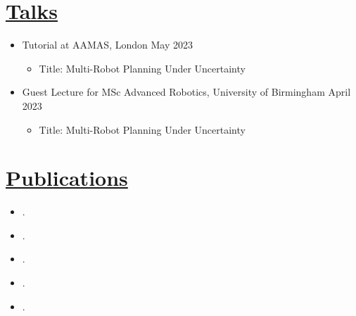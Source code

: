 \documentclass[11pt]{article}
\begin{document}
\section*{\underline{Talks}}
\begin{itemize}
\item Tutorial at AAMAS, London \hfill May 2023
\begin{itemize}
\item Title: Multi-Robot Planning Under Uncertainty
\end{itemize}
\item Guest Lecture for MSc Advanced Robotics, University of Birmingham \hfill April 2023
\begin{itemize}
\item Title: Multi-Robot Planning Under Uncertainty
\end{itemize}
\end{itemize}

\section*{\underline{Publications}}
\begin{itemize}
\item[\cite{street2023analysing}] .
\item[\cite{lacerda2022decision}] .
\item[\cite{street2022context}] .
\item[\cite{street2021congestion}] .	
\item[\cite{street2020multi}] .
\end{itemize}
\end{document}
